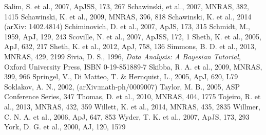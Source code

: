 \documentclass[useAMS,usenatbib]{mn2e}
\begin{document}
\begin{thebibliography}{}
 Salim, S. et al., 2007, ApJSS, 173, 267
 Schawinski, et al., 2007, MNRAS, 382, 1415
 Schawinski, K. et al., 2009, MNRAS, 396, 818
 Schawinski, K. et al., 2014 (arXiv: 1402.4814)
 Schiminovich, D. et al., 2007, ApJS, 173, 315
 Schmidt, M., 1959, ApJ, 129, 243
 Scoville, N. et al., 2007, ApJSS, 172, 1
 Sheth, K. et al., 2005, ApJ, 632, 217
 Sheth, K. et al., 2012, ApJ, 758, 136
 Simmons, B. D. et al., 2013, MNRAS, 429, 2199
 Sivia, D. S., 1996, \emph{Data Analysis: A Bayesian Tutorial}, Oxford University Press, ISBN 0-19-851889-7
 Skibba, R. A. et al., 2009, MNRAS, 399, 966
 Springel, V., Di Matteo, T. \& Hernquist, L., 2005, ApJ, 620, L79
 Soklakov, A. N., 2002, (arXiv:math-ph/0009007)
 Taylor, M. B., 2005, ASP Conference Series, 347
 Thomas, D. et al., 2010, MNRAS, 404, 1775
 Tojeiro, R. et al., 2013, MNRAS, 432, 359
 Willett, K. et al., 2014, MNRAS, 435, 2835
 Willmer, C. N. A. et al., 2006, ApJ, 647, 853
 Wyder, T. K. et al., 2007, ApJS, 173, 293
 York, D. G. et al., 2000, AJ, 120, 1579
\end{thebibliography}{}



%
\end{document}
